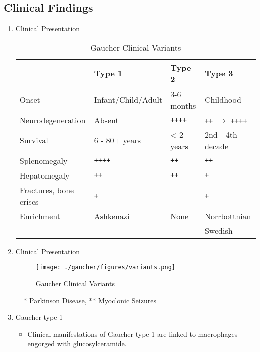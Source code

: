 \documentclass{scrartcl}
\begin{document}
\subsection{Clinical Findings}
\label{sec:orgf0da448}
\begin{enumerate}
\item Clinical Presentation
\label{sec:org18365f2}

\begin{table}[htbp]
\caption{\label{tab:org21208b4}
Gaucher Clinical Variants}
\centering
\begin{tabular}{llll}
 & Type 1 & Type 2 & Type 3\\
\hline
Onset & Infant/Child/Adult & 3-6 months & Childhood\\
Neurodegeneration & Absent & \texttt{++++} & \texttt{++} \(\to\) \texttt{++++}\\
Survival & 6 - 80+ years & < 2 years & 2nd - 4th decade\\
Splenomegaly & \texttt{++++} & \texttt{++} & \texttt{++}\\
Hepatomegaly & \texttt{++} & \texttt{++} & \texttt{+}\\
Fractures, bone crises & \texttt{+} & - & \texttt{+}\\
Enrichment & Ashkenazi & None & Norrbottnian\\
 &  &  & Swedish\\
\end{tabular}
\end{table}

\item Clinical Presentation
\label{sec:org1ebbe9c}

\begin{figure}[htbp]
\centering
\texttt{[image: ./gaucher/figures/variants.png]}
\caption{\label{fig:org1aa205f}
Gaucher Clinical Variants}
\end{figure}

= * Parkinson Disease, ** Myoclonic Seizures =
\item Gaucher type 1
\label{sec:orged7ac3d}
\begin{itemize}
\item Clinical manifestations of Gaucher type 1 are linked to macrophages
engorged with glucosylceramide.


\end{itemize}
\end{enumerate}
\end{document}
